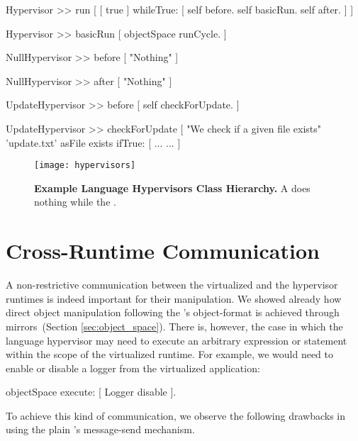 \begin{code}
Hypervisor >> run [
    [ true ] whileTrue: [
        self before.
        self basicRun.
        self after.
    ]
]

Hypervisor >> basicRun [
    objectSpace runCycle.
]

NullHypervisor >> before [
    "Nothing"
]

NullHypervisor >> after [
    "Nothing"
]

UpdateHypervisor >> before [
    self checkForUpdate.
]

UpdateHypervisor >> checkForUpdate [
    "We check if a given file exists"
    'update.txt' asFile exists ifTrue: [ ...
    ...
]
\end{code}

\begin{figure}[ht]
\center
\texttt{[image: hypervisors]}
\caption{\textbf{Example Language Hypervisors Class Hierarchy.} A  does nothing while the .\label{fig:hypervisors}}
\end{figure}

\section{Cross-Runtime Communication} \label{sec:communication}\label{sec:isolation}

A non-restrictive communication between the virtualized and the hypervisor runtimes is indeed important for their manipulation. We showed already how direct object manipulation following the \VM's object-format is achieved through mirrors~(Section \ref{sec:object_space}). There is, however, the case in which the language hypervisor may need to execute an arbitrary expression or statement within the scope of the virtualized runtime. For example, we would need to enable or disable a logger from the virtualized application:

\begin{code}
objectSpace execute: [ Logger disable ].
\end{code}

To achieve this kind of communication, we observe the following drawbacks in using the plain \VM's message-send mechanism. 

